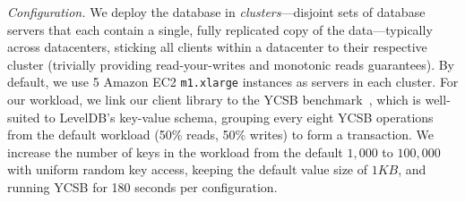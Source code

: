 \vspace{.5em}\noindent\textit{Configuration.} We deploy the database
in \textit{clusters}---disjoint sets of database servers that each
contain a single, fully replicated copy of the data---typically across
datacenters, sticking all clients within a datacenter to their
respective cluster (trivially providing read-your-writes and monotonic
reads guarantees). By default, we use 5 Amazon EC2 \texttt{m1.xlarge}
instances as servers in each cluster. For our workload, we link our
client library to the YCSB benchmark~\cite{ycsb}, which is well-suited
to LevelDB's key-value schema, grouping every eight YCSB operations
from the default workload (50\% reads, 50\% writes) to form a
transaction. We increase the number of keys in the workload from the
default $1,000$ to $100,000$ with uniform random key access, keeping
the default value size of $1KB$, and running YCSB for 180 seconds per
configuration.

